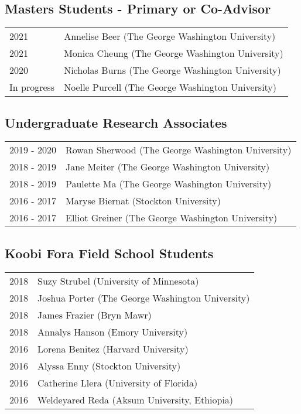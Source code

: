 \documentclass{article}
\begin{document}
\subsection*{Masters Students - Primary or Co-Advisor}
\begin{tabular}{p{}p{}}
2021 & Annelise Beer (The George Washington University)\\[4pt]
2021 & Monica Cheung (The George Washington University)\\[4pt]
2020 & Nicholas Burns (The George Washington University)\\[4pt] %
In progress & Noelle Purcell (The George Washington University)\\[4pt]%

\end{tabular}


\subsection*{Undergraduate Research Associates}
\begin{tabular}{p{}p{}}
2019 - 2020 & Rowan Sherwood (The George Washington University)\\[4pt]
2018 - 2019 & Jane Meiter (The George Washington University)\\[4pt]
2018 - 2019 & Paulette Ma (The George Washington University)\\[4pt]
2016 - 2017 & Maryse Biernat (Stockton University)\\[4pt]
2016 - 2017 & Elliot Greiner (The George Washington University)\\
\end{tabular} 

\subsection*{Koobi Fora Field School Students}
\begin{tabular}{p{}p{}}
2018 & Suzy Strubel (University of Minnesota)\\[4pt]
2018 & Joshua Porter (The George Washington University)\\[4pt]
2018 & James Frazier (Bryn Mawr)\\[4pt] 
2018 & Annalys Hanson (Emory University)\\[4pt]
2016 & Lorena Benitez (Harvard University)\\[4pt]
2016 & Alyssa Enny (Stockton University)\\[4pt]
2016 & Catherine Llera (University of Florida)\\[4pt]
2016 & Weldeyared Reda (Aksum University, Ethiopia)\\
\end{tabular}
\end{document}
